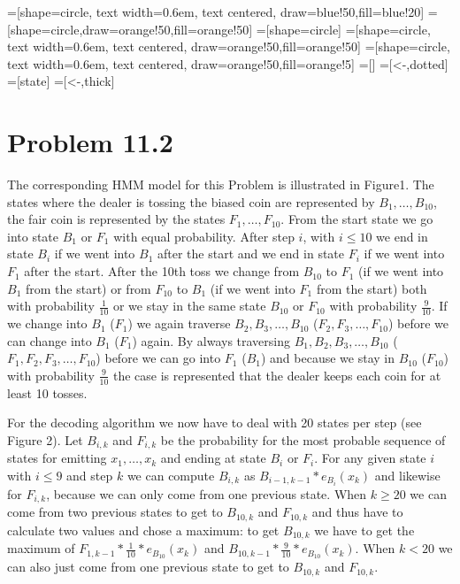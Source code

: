 \documentclass[a4paper]{article}
\begin{document}
 
=[shape=circle, text width=0.6em, text centered, draw=blue!50,fill=blue!20]
=[shape=circle,draw=orange!50,fill=orange!50]
=[shape=circle]
=[shape=circle, text width=0.6em, text centered, draw=orange!50,fill=orange!50]
=[shape=circle, text width=0.6em, text centered, draw=orange!50,fill=orange!5]
=[]
=[<-,dotted]
=[state]
=[<-,thick]

\section{Problem 11.2}

The corresponding HMM model for this Problem is illustrated in Figure1. The states where the dealer is tossing the biased coin are represented by $B_1,\hdots,B_{10}$, the fair coin is represented by the states $F_1,\hdots, F_{10}$. From the start state we go into state $B_1$ or $F_1$ with equal probability. After step $i$, with $i\leq10$ we end in state $B_i$ if we went into $B_1$ after the start and we end in state $F_i$ if we went into $F_1$ after the start. After the 10th toss we change from $B_{10}$ to $F_1$ (if we went into $B_1$ from the start) or from $F_{10}$ to $B_1$ (if we went into $F_1$ from the start) both with probability $\frac{1}{10}$ or we stay in the same state $B_{10}$ or $F_{10}$ with probability $\frac{9}{10}$.
If we change into $B_1$ ($F_1$) we again traverse $B_2, B_3, \hdots, B_{10}$ ($F_2, F_3, \hdots, F_{10}$) before we can change into $B_1$ ($F_1$) again. By always traversing $B_1, B_2, B_3, \hdots, B_{10}$ ($F_1,F_2, F_3, \hdots, F_{10}$) before we can go into $F_1$ ($B_1$) and because we stay in $B_{10}$ ($F_{10}$) with probability $\frac{9}{10}$ the case is represented that the dealer keeps each coin for at least 10 tosses.

For the decoding algorithm we now have to deal with 20 states per step (see Figure 2). Let $B_{i,k}$ and $F_{i,k}$ be the probability for the most probable sequence of states for emitting $x_1,\hdots, x_k$ and ending at state $B_i$ or $F_i$. For any given state $i$ with $i\leq9$ and step $k$ we can compute $B_{i,k}$ as $B_{i-1,k-1}*e_{B_i}(x_k)$ and likewise for $F_{i,k}$, because we can only come from one previous state. When $k\geq20$ we can come from two previous states to get to $B_{10,k}$ and $F_{10,k}$ and thus have to calculate two values and chose a maximum: to get  $B_{10,k}$ we have to get the maximum of  $F_{1,k-1}*\frac{1}{10}*e_{B_{10}}(x_k)$ and $B_{10,k-1}*\frac{9}{10}*e_{B_{10}}(x_k)$. When $k<20$ we can also just come from one previous state to get to $B_{10,k}$ and $F_{10,k}$. 
\end{document}
